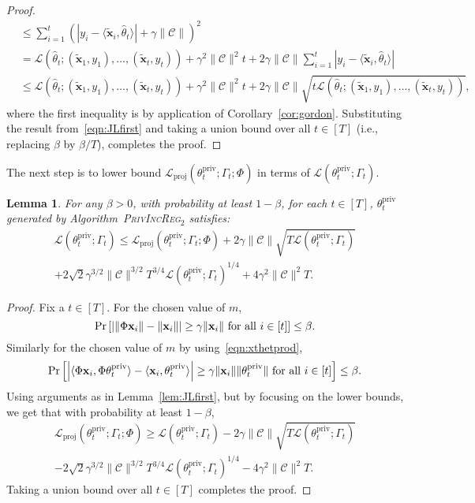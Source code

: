 \documentclass{article}
\theoremstyle{plain}
\newtheorem{lemma}[theorem]{Lemma}
\def \ProjPrivIncReg {\textsc{PrivIncReg$_2$}\xspace}
\def \CCC {\mathcal{C}}
\def \LLL {\mathcal{L}}
\def \priv {{\mathrm{priv}}}
\def \proj {{\mathrm{proj}}}
\def \x {\mathbf x}
\begin{document}
\begin{proof}
\begin{align*}
& \leq \sum_{i=1}^t (|y_i - \langle \tilde{\x}_i, \hat{\theta}_t \rangle| + \gamma \| \CCC \|)^2 \\
& = \LLL(\hat{\theta}_t;(\tilde{\x}_1,y_1),\dots,(\tilde{\x}_t,y_t)) + \gamma^{2} \| \CCC \|^{2} t + 2\gamma \| \CCC \| \sum_{i=1}^t |y_i - \langle \tilde{\x}_i, \hat{\theta}_t \rangle| \\
& \leq \LLL(\hat{\theta}_t;(\tilde{\x}_1,y_1),\dots,(\tilde{\x}_t,y_t)) + \gamma^{2} \| \CCC \|^{2} t + 2\gamma \| \CCC \| \sqrt{t \LLL(\hat{\theta}_t;(\tilde{\x}_1,y_1),\dots,(\tilde{\x}_t,y_t))},
\end{align*}
where the first inequality is by application of Corollary~\ref{cor:gordon}. Substituting the result from~\eqref{eqn:JLfirst} and taking a union bound over all $t \in [T]$ (i.e., replacing $\beta$ by $\beta/T$), completes the proof.
\end{proof}

The next step is to lower bound $\LLL_\proj(\theta^\priv_t;\Gamma_t;\Phi)$ in terms of $\LLL(\theta^\priv_t;\Gamma_t)$.
\begin{lemma} \label{lem:JLfifth}
For any $\beta > 0$, with probability at least $1 - \beta$, for each $t \in [T]$, $\theta^\priv_t$ generated by Algorithm~\ProjPrivIncReg satisfies:
\begin{multline*}
\LLL(\theta^\priv_t;\Gamma_t) \leq \LLL_\proj(\theta^\priv_t;\Gamma_t;\Phi) + 2 \gamma \| \CCC \| \sqrt{T \LLL(\theta^\priv_t;\Gamma_t)} \\
+  2\sqrt{2}\gamma^{3/2}\| \CCC \|^{3/2}T^{3/4}\LLL(\theta^\priv_t;\Gamma_t)^{1/4} + 4\gamma^2 \|\CCC\|^2 T. 
\end{multline*}
\end{lemma} 
\begin{proof}
Fix a $t \in [T]$. For the chosen value of $m$, 
$$\Pr\left[ \left | \| \Phi \x_i \| - \| \x_i \| \right | \geq \gamma \| \x_i \|~\mbox{\rm for all}~i\in[t]\right] \leq \beta.$$
Similarly for the chosen value of $m$ by using~\eqref{eqn:xthetprod},
$$\Pr\left [\left | \langle \Phi \x_i, \Phi \theta^\priv_t \rangle - \langle \x_i,\theta^\priv_t \rangle  \right | \geq \gamma \| \x_i \| \| \theta^\priv_t\|~\mbox{\rm for all}~i\in[t]\right ] \leq \beta.$$
Using arguments as in Lemma~\ref{lem:JLfirst}, but by focusing on the lower bounds, we get that with probability at least $1-\beta$,
\begin{multline*}
\LLL_\proj(\theta^\priv_t;\Gamma_t;\Phi) \geq \LLL(\theta^\priv_t;\Gamma_t) - 2 \gamma \| \CCC \| \sqrt{T \LLL(\theta^\priv_t;\Gamma_t)} \\
-  2\sqrt{2}\gamma^{3/2}\| \CCC \|^{3/2}T^{3/4}\LLL(\theta^\priv_t;\Gamma_t)^{1/4} - 4\gamma^2 \|\CCC\|^2 T.
\end{multline*}
Taking a union bound over all $t \in [T]$ completes the proof.
\end{proof}
\end{document}
